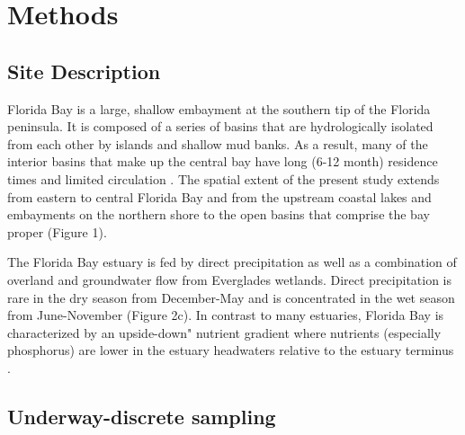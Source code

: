 \documentclass[review]{elsarticle}
\begin{document}
\section{Methods}

\subsection{Site Description}

Florida Bay is a large, shallow embayment at the southern tip of the Florida peninsula. It is composed of a series of basins that are hydrologically isolated from each other by islands and shallow mud banks. As a result, many of the interior basins that make up the central bay have long (6-12 month) residence times and limited circulation \citep{lee2016circulation}. The spatial extent of the present study extends from eastern to central Florida Bay and from the upstream coastal lakes and embayments on the northern shore to the open basins that comprise the bay proper (Figure 1).

The Florida Bay estuary is fed by direct precipitation as well as a combination of overland and groundwater flow from Everglades wetlands. Direct precipitation is rare in the dry season from December-May and is concentrated in the wet season from June-November (Figure 2c). In contrast to many estuaries, Florida Bay is characterized by an upside-down" nutrient gradient where nutrients (especially phosphorus) are lower in the estuary headwaters relative to the estuary terminus \citep{childers_relating_2006}.

\subsection{Underway-discrete sampling}
\end{document}
